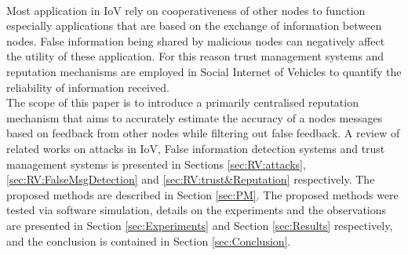 \documentclass[journal]{IEEEtran}
\begin{document}
\\Most application in IoV rely on cooperativeness of other nodes to function especially applications that are based on the exchange of information between nodes. False information being shared by malicious nodes can negatively affect the utility of these application. For this reason trust management systems and reputation mechanisms are employed in Social Internet of Vehicles to quantify the reliability of information received.
\\ The scope of this paper is to introduce a primarily centralised reputation mechanism that aims to accurately estimate the accuracy of a nodes messages based on feedback from other nodes while filtering out false feedback. A review of related works on attacks in IoV, False information detection systems and trust management systems is presented in Sections \ref{sec:RV:attacks}, \ref{sec:RV:FalseMsgDetection} and \ref{sec:RV:trust&Reputation} respectively. The proposed methods are described in Section \ref{sec:PM}. The proposed methods were tested via software simulation, details on the experiments and the observations are presented in Section \ref{sec:Experiments} and Section \ref{sec:Results} respectively, and the conclusion is contained in Section \ref{sec:Conclusion}.

 





%
%
\end{document}
